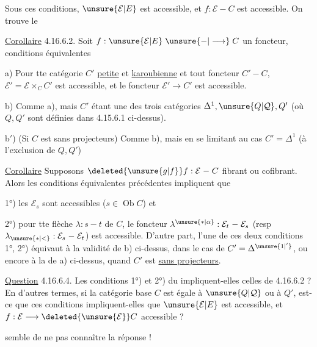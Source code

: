 Sous ces conditions, $\unsure{\mathcal E|E}$ est accessible, et
$f:\mathcal E\mathrel{-}C$ est accessible.
On trouve   le

\uline{Corollaire} 4.16.6.2. Soit $f:\unsure{\mathcal E|E}\mathrel{\unsure{-|\longrightarrow}}C$ un
foncteur, conditions équivalentes

a) Pour tte  catégorie $C'$ \uline{petite} et
\uline{karoubienne} et tout foncteur $C'\mathrel{-}C$,
$\mathcal E'=\mathcal E\times_C C'$ est accessible, et le foncteur
$\mathcal E'\longrightarrow C'$ est accessible.

b) Comme a), mais $C'$ étant une
des  trois catégories  $\Delta^1,\unsure{Q|\mathcal Q},Q'$
(où $Q,Q'$ sont définies dans 4.15.6.1 ci-dessus).

b$'$) (Si $C$ est sans projecteurs) Comme b),
mais en se limitant au cas $C'=\Delta^1$
(à l'exclusion de $Q,Q'$)

\uline{Corollaire}  Supposons $\deleted{\unsure{g|f}}f:\mathcal E\mathrel{-}C$
fibrant ou cofibrant. Alors les conditions
équivalentes précédentes impliquent que

1°) les $\mathcal E_s$ sont accessibles ($s\in\operatorname{Ob}C$) et

2°) pour tte flèche $\lambda:s\mathrel{-}t$ de $C$,
le foncteur $\lambda^{\unsure{*|\alpha}}:\mathcal E_t\mathrel{-}\mathcal E_s$ (resp $\lambda_{\unsure{*|<}}:\mathcal E_s\mathrel{-}\mathcal E_t$)
est accessible.  D'autre part,
l'une de ces deux conditions 1°, 2°) équivaut
à la validité de b) ci-dessus, dans le
cas de $C'=\Delta^{\unsure{1|'}}$, ou encore à la 
de a) ci-dessus, quand $C'$ est \uline{sans projecteurs}.

\uline{Question} 4.16.6.4. Les conditions 1°) et 2°) du
 impliquent-elles celles de 4.16.6.2 ?
En d'autres termes, si la catégorie base
$C$ est égale à $\unsure{Q|\mathcal Q}$ ou à $Q'$, est-ce que ces
conditions impliquent-elles que $\unsure{\mathcal E|E}$ est
accessible, et $f:\mathcal E\longrightarrow\deleted{\unsure{\mathcal E}}C$ accessible ?

 semble  de ne pas connaître
la réponse !

